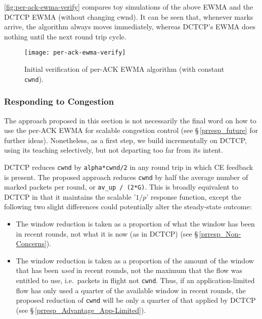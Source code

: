 \autoref{fig:per-ack-ewma-verify} compares toy simulations of the above EWMA and
the DCTCP EWMA (without changing cwnd). It can be seen that, whenever marks
arrive, the algorithm always moves immediately, whereas DCTCP's EWMA does
nothing until the next round trip cycle.
\begin{figure}[h]
	\texttt{[image: per-ack-ewma-verify]}
	\caption{Initial verification of per-ACK EWMA algorithm (with constant \texttt{cwnd}).}\label{fig:per-ack-ewma-verify}
\end{figure}


\subsubsection{Responding to Congestion}\label{prresp_congestion_response}

The approach proposed in this section is not necessarily the final word on how
to use the per-ACK EWMA for scalable congestion control (see
\S\,\ref{prresp_future} for further ideas). Nonetheless, as a first step, we
build incrementally on DCTCP, using its teaching selectively, but not departing
too far from its intent. 

DCTCP reduces \texttt{cwnd} by \texttt{alpha*cwnd/2} in any round trip in which
CE feedback is present. The proposed approach reduces \texttt{cwnd} by half the
average number of marked packets per round, or \texttt{av\_up / (2*G)}. This is
broadly equivalent to DCTCP in that it maintains the scalable '\(1/p\)' response
function, except the following two slight differences could potentially alter
the steady-state outcome:
\begin{itemize}[nosep]
	\item The window reduction is taken as a proportion of what the window has been
	in recent rounds, not what it is now (as in DCTCP) (see
	\S\,\ref{prresp_Non-Concerns}).
	\item The window reduction is taken as a proportion of the amount of the window
	that has been \emph{used} in recent rounds, not the maximum that the flow was
	entitled to use, i.e.\ packets in flight not \texttt{cwnd}. Thus, if an
	application-limited flow has only used a quarter of the available window in
	recent rounds, the proposed reduction of \texttt{cwnd} will be only a quarter of
	that applied by DCTCP (see \S\,\ref{prresp_Advantage_App-Limited}).
\end{itemize}

